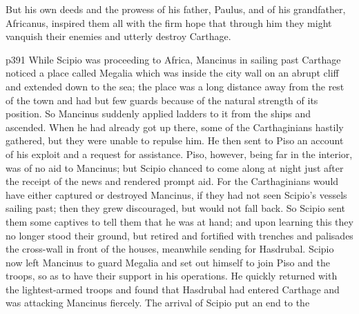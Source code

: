 But his own deeds and the prowess of his father, Paulus, and of his grandfather, Africanus, inspired them all with the firm hope that through him they might vanquish their enemies and utterly destroy Carthage.

p391
While Scipio was proceeding to Africa, Mancinus in sailing past Carthage noticed a place called Megalia which was inside the city wall on an abrupt cliff and extended down to the sea; the place was a long distance away from the rest of the town and had but few guards because of the natural strength of its position. So Mancinus suddenly applied ladders to it from the ships and ascended. When he had already got up there, some of the Carthaginians hastily gathered, but they were unable to repulse him. He then sent to Piso an account of his exploit and a request for assistance. Piso, however, being far in the interior, was of no aid to Mancinus; but Scipio chanced to come along at night just after the receipt of the news and rendered prompt aid. For the Carthaginians would have either captured or destroyed Mancinus, if they had not seen Scipio's vessels sailing past; then they grew discouraged, but would not fall back. So Scipio sent them some captives to tell them that he was at hand; and upon learning this they no longer stood their ground, but retired and fortified with trenches and palisades the cross-wall in front of the houses, meanwhile sending for Hasdrubal. Scipio now left Mancinus to guard Megalia and set out himself to join Piso and the troops, so as to have their support in his operations. He quickly returned with the lightest-armed troops and found that Hasdrubal had entered Carthage and was attacking Mancinus fiercely. The arrival of Scipio put an end to the


